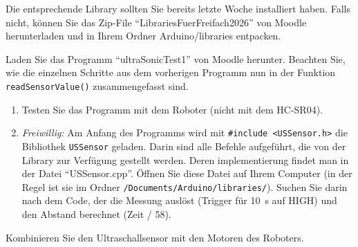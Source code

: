 Die entsprechende Library sollten Sie bereits letzte Woche installiert haben. Falls nicht, können Sie das Zip-File \enquote{LibrariesFuerFreifach2026} von Moodle herunterladen und in Ihrem Ordner Arduino/libraries entpacken.
\begin{myexercise}

    Laden Sie das Programm \enquote{ultraSonicTest1} von Moodle herunter.
    \newline
    Beachten Sie, wie die einzelnen Schritte aus dem vorherigen Programm nun in der Funktion \lstinline|readSensorValue()| zusammengefasst sind.
    \begin{enumerate}
        \item Testen Sie das Programm mit dem Roboter (nicht mit dem HC-SR04).
        \item \emph{Freiwillig:} Am Anfang des Programms wird mit \lstinline|#include <USSensor.h>| die Bibliothek \lstinline|USSensor| geladen. Darin sind alle Befehle aufgeführt, die von der Library zur Verfügung gestellt werden. Deren implementierung findet man in der Datei \enquote{USSensor.cpp}. Öffnen Sie diese Datei auf Ihrem Computer (in der Regel ist sie im Ordner \lstinline|/Documents/Arduino/libraries/|). Suchen Sie darin nach dem Code, der die Messung auslöst (Trigger für 10\si{\mu\second} auf HIGH) und den Abstand berechnet (Zeit / 58).
    \end{enumerate}

\end{myexercise}

Kombinieren Sie den Ultraschallsensor mit den Motoren des Roboters.

